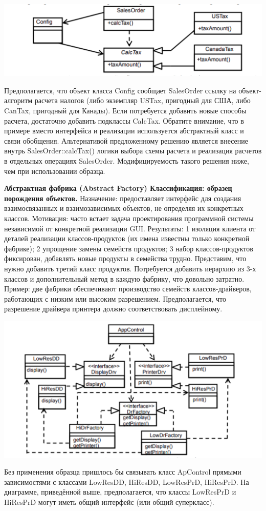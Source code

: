 \includegraphics[scale=0.07]{pics/5_2.png}

Предполагается, что объект класса Config сообщает SalesOrder ссылку на объект-алгоритм расчета налогов (либо экземпляр USTax, пригодный для США, либо CanTax, пригодный для Канады). Если потребуется добавить новые способы расчета, достаточно добавить подклассы CalcTax. Обратите внимание, что в примере вместо интерфейса и реализации используется абстрактный класс и связи обобщения. Альтернативой предложенному решению является внесение внутрь SalesOrder::calcTax() логики выбора схемы расчета и реализация расчетов в отдельных операциях SalesOrder. Модифицируемость такого решения ниже, чем при использовании образца.

\textbf{Абстрактная фабрика (Abstract Factory) Классификация: образец порождения объектов.} Назначение: предоставляет интерфейс для создания взаимосвязанных и взаимозависимых объектов, не определяя их конкретных классов. Мотивация: часто встает задача проектирования программной системы независимой от конкретной реализации GUI. Результаты:
1 изоляция клиента от деталей реализации классов-продуктов (их имена известны только конкретной фабрике); 2 упрощение замены семейств продуктов; 3 набор классов-продуктов фиксирован, добавлять новые продукты в семейства трудно. Представим, что нужно добавить третий класс продуктов. Потребуется добавить иерархию из 3-х классов и дополнительный метод в каждую фабрику, что довольно затратно. Пример: две фабрики обеспечивают производство семейств классов-драйверов, работающих с низким или высоким разрешением. Предполагается, что разрешение драйвера принтера должно соответствовать дисплейному.

\includegraphics[scale=0.08]{pics/5_3.png}

Без применения образца пришлось бы связывать класс ApControl прямыми зависимостями с классами LowResDD, HiResDD, LowResPrD, HiResPrD. На диаграмме, приведённой выше, предполагается, что классы LowResPrD и HiResPrD могут иметь общий интерфейс (или общий суперкласс).